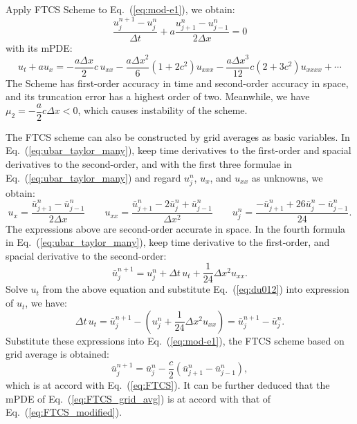 \documentclass[]{article}
\newcommand{\me}{\mathrm{e}}
\newcommand{\mi}{\mathrm{i}}
\begin{document}
Apply FTCS Scheme to Eq.~(\ref{eq:mod-e1}), we obtain:
\begin{equation}
\dfrac{u_j^{n+1}-u_j^n}{\Delta t}+a\dfrac{u_{j+1}^n-u_{j-1}^n}{2\Delta x}=0
\label{eq:FTCS}
\end{equation}
with its mPDE:
\begin{equation}
u_t+au_x=-\dfrac{a\Delta x}{2}c\, u_{xx}-\dfrac{a\Delta x^2}{6}(1+2c^2)u_{xxx} -\dfrac{a\Delta x^3}{12}c(2+3c^2)u_{xxxx}+\cdots
\label{eq:FTCS_modified}
\end{equation}
The Scheme has first-order accuracy in time and second-order accuracy
in space, and its truncation error has a highest order of
two. Meanwhile, we have $\mu_2 = -\dfrac{a}{2}c\Delta x<0$, which
causes instability of the scheme.

The FTCS scheme can also be constructed by grid averages as basic
variables. In Eq.~(\ref{eq:ubar_taylor_many}), keep time derivatives
to the first-order and spacial derivatives to the second-order, and
with the first three formulae in Eq.~(\ref{eq:ubar_taylor_many}) and
regard $u_j^n$, $u_x$, and $u_{xx}$ as unknowns, we obtain:
\begin{equation}
u_x = \frac{\bar u_{j+1}^n-\bar u_{j-1}^n}{2\Delta x} \qquad
u_{xx} = \frac{\bar u_{j+1}^n-2\bar u_j^n+\bar u_{j-1}^n}{\Delta x^2} \qquad
u_j^n = \frac{-\bar u_{j+1}^n + 26\bar u_j^n - \bar u_{j-1}^n}{24}.
\label{eq:du012}
\end{equation}
The expressions above are second-order accurate in space. In the
fourth formula in Eq.~(\ref{eq:ubar_taylor_many}), keep time
derivative to the first-order, and spacial derivative to the 
second-order:
\[
\bar u_{j}^{n+1} = u_j^n+\Delta t\, u_t + \frac{1}{24} \Delta x^2 u_{xx}.
\]
Solve $u_t$ from the above equation and substitute
Eq.~(\ref{eq:du012}) into expression of $u_t$, we have:
\[
\Delta t\, u_t =  \bar u_j^{n+1}-\left(u_j^n +\frac{1}{24} \Delta x^2
u_{xx}\right) = \bar u_j^{n+1}- \bar u_{j}^n.
\]
Substitute these expressions into Eq.~(\ref{eq:mod-e1}), the FTCS
scheme based on grid average is obtained:
\begin{equation}
\bar u_j^{n+1} = \bar u_j^n - \frac{c}{2} \left(\bar u_{j+1}^n-\bar u_{j-1}^n\right),
\label{eq:FTCS_grid_avg}
\end{equation}
which is at accord with Eq.~(\ref{eq:FTCS}). It can be further deduced
that the mPDE of Eq.~(\ref{eq:FTCS_grid_avg}) is at
accord with that of Eq.~(\ref{eq:FTCS_modified}).
\end{document}
